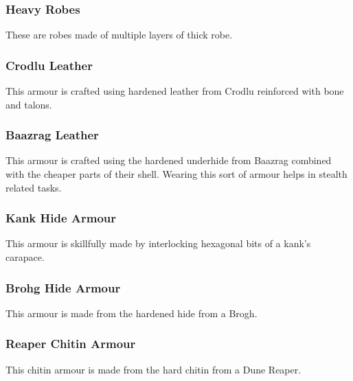 \begin{multicols}{2}

\subsubsection{Heavy Robes}
\label{itmamr:heavyrobes}
These are robes made of multiple layers of thick robe.


\subsubsection{Crodlu Leather}
\label{itmamr:crodluleather}
This armour is crafted using hardened leather from Crodlu reinforced with bone and talons.

\subsubsection{Baazrag Leather}
\label{itmamr:baazragleather}
This armour is crafted using the hardened underhide from Baazrag combined with the cheaper parts of their shell. 
Wearing this sort of armour helps in stealth related tasks.

\subsubsection{Kank Hide Armour}
\label{itmamr:kankhide}
This armour is skillfully made by interlocking hexagonal bits of a kank’s carapace.

\subsubsection{Brohg Hide Armour}
\label{itmamr:brohghide}
This armour is made from the hardened hide from a Brogh.

\subsubsection{Reaper Chitin Armour}
\label{itmamr:reaperchitin}
This chitin armour is made from the hard chitin from a Dune Reaper.



\end{multicols}
